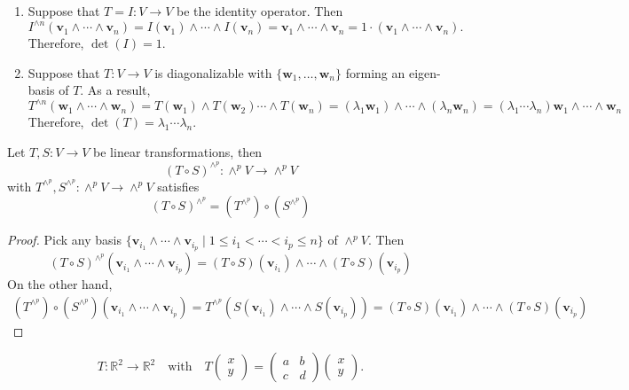 \begin{example}
\begin{enumerate}
    \item Suppose that $T = I : V \to V$ be the identity operator. Then
\[
I^{\wedge n}(\mathbf{v}_1 \wedge \cdots \wedge \mathbf{v}_n) = I(\mathbf{v}_1) \wedge \cdots \wedge I(\mathbf{v}_n) = \mathbf{v}_1 \wedge \cdots \wedge \mathbf{v}_n = 1 \cdot (\mathbf{v}_1 \wedge \cdots \wedge \mathbf{v}_n).
\]
Therefore, $\det(I) = 1$.

\item Suppose that $T : V \to V$ is diagonalizable with $\{\mathbf{w}_1, \dots, \mathbf{w}_n\}$ forming an eigen-basis of $T$. As a result,
\[
T^{\wedge n}(\mathbf{w}_1 \wedge \cdots \wedge \mathbf{w}_n) = T(\mathbf{w}_1) \wedge T(\mathbf{w}_2) \cdots \wedge T(\mathbf{w}_n) 
=(\lambda_1 \mathbf{w}_1) \wedge \cdots \wedge (\lambda_n \mathbf{w}_n) = (\lambda_1 \cdots \lambda_n)\mathbf{w}_1 \wedge \cdots \wedge \mathbf{w}_n
\]
Therefore, $\det(T) = \lambda_1 \cdots \lambda_n$.
\end{enumerate}
\end{example}

\begin{proposition}
Let $T, S : V \to V$ be linear transformations, then
\[
(T \circ S)^{\wedge^p} : \wedge^p V \to \wedge^p V
\]
with $T^{\wedge^p}, S^{\wedge^p} : \wedge^p V \to \wedge^p V$ satisfies
\[
(T \circ S)^{\wedge^p} = (T^{\wedge^p}) \circ (S^{\wedge^p})
\]
\end{proposition}

\begin{proof}
Pick any basis $\{ \mathbf{v}_{i_1} \wedge \cdots \wedge \mathbf{v}_{i_p} \mid 1 \leq i_1 < \cdots < i_p \leq n \}$ of $\wedge^p V$. Then
\[
(T \circ S)^{\wedge^p}(\mathbf{v}_{i_1} \wedge \cdots \wedge \mathbf{v}_{i_p}) = (T \circ S)(\mathbf{v}_{i_1}) \wedge \cdots \wedge (T \circ S)(\mathbf{v}_{i_p})
\]
On the other hand,
\begin{align*}
    (T^{\wedge^p}) \circ (S^{\wedge^p})(\mathbf{v}_{i_1} \wedge \cdots \wedge \mathbf{v}_{i_p}) = T^{\wedge^p}(S(\mathbf{v}_{i_1}) \wedge \cdots \wedge S(\mathbf{v}_{i_p})) = 
    (T \circ S)(\mathbf{v}_{i_1}) \wedge \cdots \wedge (T \circ S)(\mathbf{v}_{i_p})
\end{align*}
\end{proof}

\[
T : \mathbb{R}^2 \to \mathbb{R}^2
\quad \text{with} \quad
T\begin{pmatrix} x \\ y \end{pmatrix}
= \begin{pmatrix}
a & b \\
c & d
\end{pmatrix}
\begin{pmatrix}
x \\ y
\end{pmatrix}.
\]

